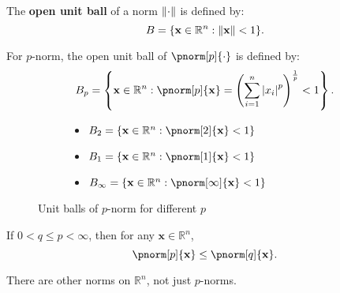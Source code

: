 \documentclass{huhtakm-template-book-v2}
\begin{document}
    \begin{defn}
        The \textbf{open unit ball} of a norm $\lVert{\cdot}\rVert$ is defined by:
        \begin{equation*}
            B = \{\mathbf{x} \in \mathbb{R}^{n} : \lVert{\mathbf{x}}\rVert < 1\}.
        \end{equation*}
    \end{defn}
    \begin{eg}
        For $p$-norm, the open unit ball of $\pnorm[p]{\cdot}$ is defined by:
        \begin{equation*}
            B_{p} = \left\{\mathbf{x} \in \mathbb{R}^{n} : \pnorm[p]{\mathbf{x}} = \left(\sum_{i=1}^{n}\abs{x_{i}}^{p}\right)^{\frac{1}{p}} < 1\right\}.
        \end{equation*}
    \end{eg}
    \begin{figure}[h]
        \centering
        \begin{subfigure}[h]{0.3\textwidth}
            \centering
        \end{subfigure}
        \begin{subfigure}[h]{0.5\textwidth}
            \centering
            \begin{itemize}
                \color{red}
                \item[] $B_{2} = \{\mathbf{x} \in \mathbb{R}^{n} : \pnorm[2]{\mathbf{x}} < 1\}$
                \color{blue}
                \item[] $B_{1} = \{\mathbf{x} \in \mathbb{R}^{n} : \pnorm[1]{\mathbf{x}} < 1\}$
                \color{green}
                \item[] $B_{\infty} = \{\mathbf{x} \in \mathbb{R}^{n} : \pnorm[\infty]{\mathbf{x}} < 1\}$
            \end{itemize}
        \end{subfigure}
        \caption{Unit balls of $p$-norm for different $p$}
    \end{figure}
    \begin{thm}
        If $0 < q \leq p < \infty$, then for any $\mathbf{x} \in \mathbb{R}^{n}$,
        \begin{equation*}
            \pnorm[p]{\mathbf{x}} \leq \pnorm[q]{\mathbf{x}}.
        \end{equation*}
    \end{thm}
    \begin{rem}
        There are other norms on $\mathbb{R}^{n}$, not just $p$-norms.
    \end{rem}
    \newpage
    
\end{document}

